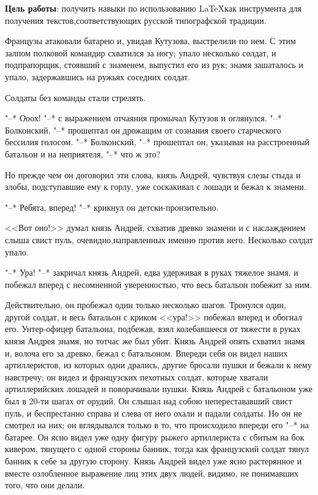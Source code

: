 \documentclass[a4paper,14pt]{article}
\begin{document}

\large{
    \par \textbf{Цель работы}: получить навыки по использованию \LaTeX как инструмента для получения текстов,соответствующих русской типографской традиции.
    \bigskip
    \par Французы атаковали батарею и, увидав Кутузова, выстрелили по нем. С этим залпом полковой командир схватился за ногу; упало несколько солдат, и подпрапорщик, стоявший с знаменем, выпустил его из рук; знамя зашаталось и упало, задержавшись на ружьях соседних солдат.
    \par Солдаты без команды стали стрелять.
    \par "--* Ооох! "--* с выражением отчаяния промычал Кутузов и оглянулся. "--* Болконский, "--* прошептал он дрожащим от сознания своего старческого бессилия голосом. "--* Болконский, "--* прошептал он, указывая на расстроенный батальон и на неприятеля, "--* что ж это?
    \par Но прежде чем он договорил эти слова, князь Андрей, чувствуя слезы стыда и злобы, подступавшие ему к горлу, уже соскакивал с лошади и бежал к знамени.
    \par "--* Ребята, вперед! "--* крикнул он детски-пронзительно.
    \par <<Вот оно!>> думал князь Андрей, схватив древко знамени и с наслаждением слыша свист пуль, очевидно,направленных именно против него. Несколько солдат упало.
    \par "--* Ура! "--* закричал князь Андрей, едва удерживая в руках тяжелое знамя, и побежал вперед с несомненной уверенностью, что весь батальон побежит за ним.
    \par Действительно, он пробежал один только несколько шагов. Тронулся один, другой солдат, и весь батальон с криком <<ура!>> побежал вперед и обогнал его. Унтер-офицер батальона, подбежав, взял колебавшееся от тяжести в руках князя Андрея знамя, но тотчас же был убит. Князь Андрей опять схватил знамя и, волоча его за древко, бежал с батальоном. Впереди себя он видел наших артиллеристов, из которых одни дрались, другие бросали пушки и бежали к нему навстречу; он видел и французских пехотных солдат, которые хватали артиллерийских лошадей и поворачивали пушки. Князь Андрей с батальоном уже был в 20-ти шагах от орудий. Он слышал над собою неперестававший свист пуль, и беспрестанно справа и слева от него охали и падали солдаты. Но он не смотрел на них; он вглядывался только в то, что происходило впереди его "--* на батарее. Он ясно видел уже одну фигуру рыжего артиллериста с сбитым на бок кивером, тянущего с одной стороны банник, тогда как французский солдат тянул банник к себе за другую сторону. Князь Андрей видел уже ясно растерянное и вместе озлобленное выражение лиц этих двух людей, видимо, не понимавших того, что они делали.
}
\end{document}
